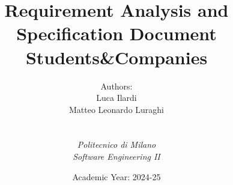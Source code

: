 
\def\Company{Consultancy}
\def\Institute{\textit{Politecnico di Milano}}
\def\Course{\textit{Software Engineering II}}

\def\BoldTitle{Requirement Analysis and Specification Document}

\def\Subtitle{Students\&Companies}
\def\Authors{
    Authors:\newline
    
    Luca Ilardi\newline
    
    Matteo Leonardo Luraghi
} 
\def\Shortname{A.Sandu}


\title{\textbf{\BoldTitle}\\\Subtitle}
\author{ 
    Authors:\\
    Luca Ilardi\\
    Matteo Leonardo Luraghi
    \\ \\ \\ \Institute\\ \Course}
\date{Academic Year: 2024-25}

